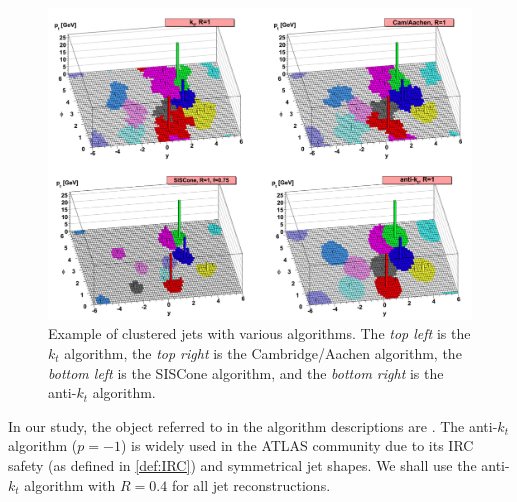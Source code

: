 \begin{figure}[ht]
    \centering
    \includegraphics[width=1.\textwidth]{src/img/anitkt.png}
    \caption{Example of clustered jets with various algorithms. The \emph{top left} is the $k_t$ algorithm, the \emph{top right} is the Cambridge/Aachen algorithm, the \emph{bottom left} is the SISCone algorithm, and the \emph{bottom right} is the anti-$k_t$ algorithm.}
    \label{fig:jet_reco}
\end{figure}

In our study, the object referred to in the algorithm descriptions are \PFOs.
The anti-$k_t$ algorithm ($p=-1$) is widely used in the ATLAS community due to its IRC safety (as defined in \cref{def:IRC}) and symmetrical jet shapes. 
We shall use the anti-$k_t$ algorithm with $R=0.4$ for all jet reconstructions.

